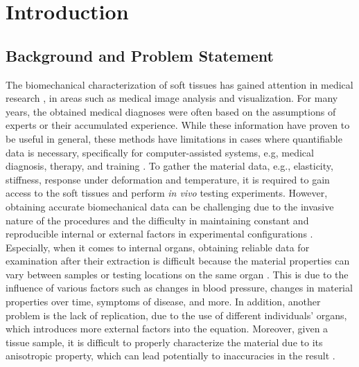 
\chapter{Introduction} %
\label{chapter:introduction} %

\section{Background and Problem Statement}
The biomechanical characterization of soft tissues has gained attention
in medical research \cite{Cox2006}, in areas such as medical image analysis and visualization.
For many years, the obtained medical diagnoses were often based on the assumptions of experts or 
their accumulated experience. While these information have proven to be useful in general, 
these methods have limitations in cases where quantifiable data is necessary, specifically for computer-assisted systems, e.g,
medical diagnosis, therapy, and training \cite{Kauer2002}.
To gather the material data, e.g., elasticity, stiffness, response under deformation and temperature, it is required 
to gain access to the soft tissues and perform \textit{in vivo} testing experiments. 
However, obtaining accurate biomechanical data can be challenging 
due to the invasive nature of the procedures and the difficulty in maintaining constant and reproducible internal or external factors  
in experimental configurations \cite{Carter2001}.\\

Especially, when it comes to internal organs, obtaining reliable data for examination after their 
extraction is difficult because the material properties can vary between samples or testing 
locations on the same organ \cite{Chai2013}. This is due to the influence of various factors such as changes in blood pressure, changes in material properties 
over time, symptoms of disease, and more. In addition, another problem is the lack 
of replication, due to the use of different individuals' organs, which introduces more external
factors into the equation. Moreover, given a tissue sample, it is difficult to properly 
characterize the material due to its anisotropic property, which can lead potentially
 to inaccuracies in the result \cite{Cox2006}.

